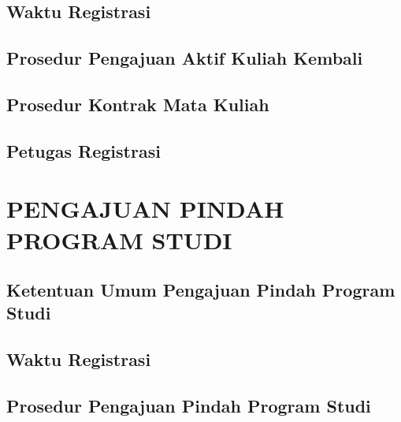 \documentclass[
]{book}
\begin{document}
\hypertarget{waktu-registrasi-3}{%
\section{Waktu Registrasi}\label{waktu-registrasi-3}}

\hypertarget{prosedur-pengajuan-aktif-kuliah-kembali}{%
\section{Prosedur Pengajuan Aktif Kuliah Kembali}\label{prosedur-pengajuan-aktif-kuliah-kembali}}

\hypertarget{prosedur-kontrak-mata-kuliah-2}{%
\section{Prosedur Kontrak Mata Kuliah}\label{prosedur-kontrak-mata-kuliah-2}}

\hypertarget{petugas-registrasi-3}{%
\section{Petugas Registrasi}\label{petugas-registrasi-3}}

\hypertarget{pengajuan-pindah-program-studi}{%
\chapter{PENGAJUAN PINDAH PROGRAM STUDI}\label{pengajuan-pindah-program-studi}}

\hypertarget{ketentuan-umum-pengajuan-pindah-program-studi}{%
\section{Ketentuan Umum Pengajuan Pindah Program Studi}\label{ketentuan-umum-pengajuan-pindah-program-studi}}

\hypertarget{waktu-registrasi-4}{%
\section{Waktu Registrasi}\label{waktu-registrasi-4}}

\hypertarget{prosedur-pengajuan-pindah-program-studi}{%
\section{Prosedur Pengajuan Pindah Program Studi}\label{prosedur-pengajuan-pindah-program-studi}}
\end{document}
